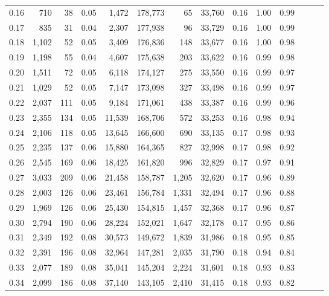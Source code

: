 \begin{tabular}{rrrrrrrrrrrrrr}
0.16 &    710 &   38 &  0.05 &    1,472 &  178,773 &      65 &  33,760 &  0.16 &  1.00 &      0.99 \\
0.17 &    835 &   31 &  0.04 &    2,307 &  177,938 &      96 &  33,729 &  0.16 &  1.00 &      0.99 \\
0.18 &  1,102 &   52 &  0.05 &    3,409 &  176,836 &     148 &  33,677 &  0.16 &  1.00 &      0.98 \\
0.19 &  1,198 &   55 &  0.04 &    4,607 &  175,638 &     203 &  33,622 &  0.16 &  0.99 &      0.98 \\
0.20 &  1,511 &   72 &  0.05 &    6,118 &  174,127 &     275 &  33,550 &  0.16 &  0.99 &      0.97 \\
0.21 &  1,029 &   52 &  0.05 &    7,147 &  173,098 &     327 &  33,498 &  0.16 &  0.99 &      0.97 \\
0.22 &  2,037 &  111 &  0.05 &    9,184 &  171,061 &     438 &  33,387 &  0.16 &  0.99 &      0.96 \\
0.23 &  2,355 &  134 &  0.05 &   11,539 &  168,706 &     572 &  33,253 &  0.16 &  0.98 &      0.94 \\
0.24 &  2,106 &  118 &  0.05 &   13,645 &  166,600 &     690 &  33,135 &  0.17 &  0.98 &      0.93 \\
0.25 &  2,235 &  137 &  0.06 &   15,880 &  164,365 &     827 &  32,998 &  0.17 &  0.98 &      0.92 \\
0.26 &  2,545 &  169 &  0.06 &   18,425 &  161,820 &     996 &  32,829 &  0.17 &  0.97 &      0.91 \\
0.27 &  3,033 &  209 &  0.06 &   21,458 &  158,787 &   1,205 &  32,620 &  0.17 &  0.96 &      0.89 \\
0.28 &  2,003 &  126 &  0.06 &   23,461 &  156,784 &   1,331 &  32,494 &  0.17 &  0.96 &      0.88 \\
0.29 &  1,969 &  126 &  0.06 &   25,430 &  154,815 &   1,457 &  32,368 &  0.17 &  0.96 &      0.87 \\
0.30 &  2,794 &  190 &  0.06 &   28,224 &  152,021 &   1,647 &  32,178 &  0.17 &  0.95 &      0.86 \\
0.31 &  2,349 &  192 &  0.08 &   30,573 &  149,672 &   1,839 &  31,986 &  0.18 &  0.95 &      0.85 \\
0.32 &  2,391 &  196 &  0.08 &   32,964 &  147,281 &   2,035 &  31,790 &  0.18 &  0.94 &      0.84 \\
0.33 &  2,077 &  189 &  0.08 &   35,041 &  145,204 &   2,224 &  31,601 &  0.18 &  0.93 &      0.83 \\
0.34 &  2,099 &  186 &  0.08 &   37,140 &  143,105 &   2,410 &  31,415 &  0.18 &  0.93 &      0.82 \\

\end{tabular}
